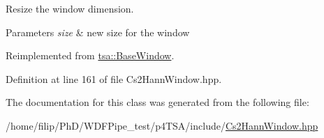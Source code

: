 Resize the window dimension.


\begin{DoxyParams}{Parameters}
{\em size} & new size for the window \\
\hline
\end{DoxyParams}


Reimplemented from \hyperlink{classtsa_1_1_base_window_a8a2a3425f2915762d50fa57dd0e04f22}{tsa\+::\+Base\+Window}.



Definition at line 161 of file Cs2\+Hann\+Window.\+hpp.



The documentation for this class was generated from the following file\+:\begin{DoxyCompactItemize}
\item 
/home/filip/\+Ph\+D/\+W\+D\+F\+Pipe\+\_\+test/p4\+T\+S\+A/include/\hyperlink{_cs2_hann_window_8hpp}{Cs2\+Hann\+Window.\+hpp}\end{DoxyCompactItemize}
